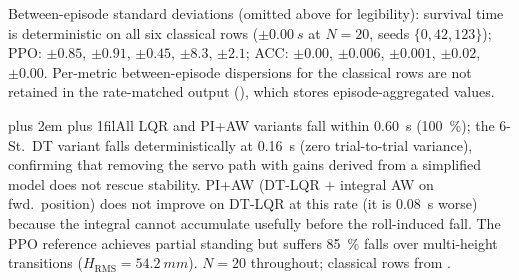 \documentclass[a4paper,fleqn]{cas-dc}
\newcommand{\tabnote}{\par\leftskip=0pt\rightskip=0pt plus 2em%
  \parfillskip=0pt plus 1fil\relax}
\begin{document}
\begin{table}[pos=!tbp]
Between-episode standard deviations (omitted above for legibility): survival time is
deterministic on all six classical rows ($\pm\SI{0.00}{s}$ at $N{=}20$, seeds $\{0,42,123\}$);
PPO: $\pm0.85$, $\pm0.91$, $\pm0.45$, $\pm8.3$, $\pm2.1$;
ACC: $\pm0.00$, $\pm0.006$, $\pm0.001$, $\pm0.02$, $\pm0.00$.
Per-metric between-episode dispersions for the classical rows are not retained in the
rate-matched output (), which stores
episode-aggregated values.
\vspace{2pt}\tabnote\noindent All LQR and PI+AW variants fall within \SI{0.60}{s} (\SI{100}{\percent}); the 6-St.\ DT variant falls deterministically at \SI{0.16}{s} (zero trial-to-trial variance), confirming that removing the servo path with gains derived from a simplified model does not rescue stability. PI+AW (DT-LQR $+$ integral AW on fwd.\ position) does not improve on DT-LQR at this rate (it is \SI{0.08}{s} worse) because the integral cannot accumulate usefully before the roll-induced fall. The PPO reference achieves partial standing but suffers \SI{85}{\percent} falls over multi-height transitions ($H_{\text{RMS}}{=}\SI{54.2}{mm}$). $N{=}20$ throughout; classical rows from .
\end{table}
\end{document}
